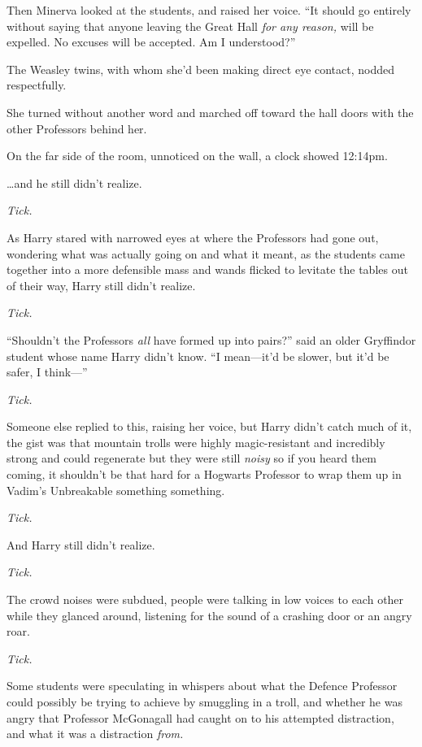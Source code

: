 Then Minerva looked at the students, and raised her voice. “It should go
entirely without saying that anyone leaving the Great Hall \emph{for any
reason,} will be expelled. No excuses will be accepted. Am I understood?”

The Weasley twins, with whom she’d been making direct eye contact, nodded
respectfully.

She turned without another word and marched off toward the hall doors with the
other Professors behind her.

On the far side of the room, unnoticed on the wall, a clock showed 12:14pm.

\later

…and he still didn’t realize.

\emph{Tick.}

As Harry stared with narrowed eyes at where the Professors had gone out,
wondering what was actually going on and what it meant, as the students came
together into a more defensible mass and wands flicked to levitate the tables
out of their way, Harry still didn’t realize.

\emph{Tick.}

“Shouldn’t the Professors \emph{all} have formed up into pairs?” said an older
Gryffindor student whose name Harry didn’t know. “I mean—it’d be slower, but
it’d be safer, I think—”

\emph{Tick.}

Someone else replied to this, raising her voice, but Harry didn’t catch much of
it, the gist was that mountain trolls were highly magic-resistant and
incredibly strong and could regenerate but they were still \emph{noisy} so if
you heard them coming, it shouldn’t be that hard for a Hogwarts Professor to
wrap them up in Vadim’s Unbreakable something something.

\emph{Tick.}

And Harry still didn’t realize.

\emph{Tick.}

The crowd noises were subdued, people were talking in low voices to each other
while they glanced around, listening for the sound of a crashing door or an
angry roar.

\emph{Tick.}

Some students were speculating in whispers about what the Defence Professor
could possibly be trying to achieve by smuggling in a troll, and whether he was
angry that Professor McGonagall had caught on to his attempted distraction, and
what it was a distraction \emph{from.}

